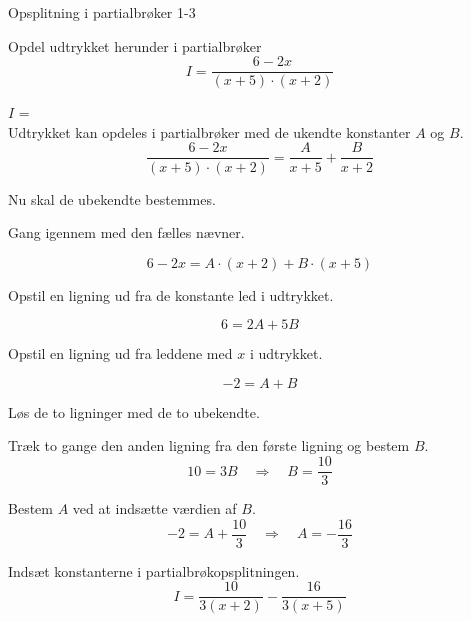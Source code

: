 \documentclass{article}
\begin{document}
\begin{exercise}{Opsplitning i partialbrøker 1-3}
	
	Opdel udtrykket herunder i partialbrøker
	\[
	I = \frac{6 - 2x}{(x + 5) \cdot (x + 2)}
	\]
	
	$I$ =  \\
	
	\hint
	Udtrykket kan opdeles i partialbrøker med de ukendte konstanter $A$ og $B$.
	\[
	\frac{6 - 2x}{(x + 5) \cdot (x + 2)} = 
	\frac{A}{x + 5} + \frac{B}{x + 2}
	\]
	
	\hint
	Nu skal de ubekendte bestemmes.
	
	\hint
	Gang igennem med den fælles nævner.
	
	\hint
	\[
	6 - 2x = A \cdot (x + 2) + B \cdot (x + 5)
	\]
	
	\hint
	Opstil en ligning ud fra de konstante led i udtrykket.
	
	\hint
	\[
	6 = 2A +  5B
	\]
	
	\hint
	Opstil en ligning ud fra leddene med $x$ i udtrykket.
	
	\hint
	\[
	-2 = A + B
	\]
	
	\hint
	Løs de to ligninger med de to ubekendte.
	
	\hint
	Træk to gange den anden ligning fra den første ligning og bestem $B$. 
	\[
	10 = 3B \quad	\Rightarrow		\quad		B = \frac{10}{3}
	\]
	
	\hint
	Bestem $A$ ved at indsætte værdien af $B$.
	\[
	-2 =  A + \frac{10}{3} \quad 	\Rightarrow		\quad A = -\frac{16}{3}
	\]
	
	\hint
	Indsæt konstanterne i partialbrøkopsplitningen.
	\[
	I = \frac{10}{3(x+2)} - \frac{16}{3(x+5)}
	\]
	
	
	
\end{exercise}
\end{document}
